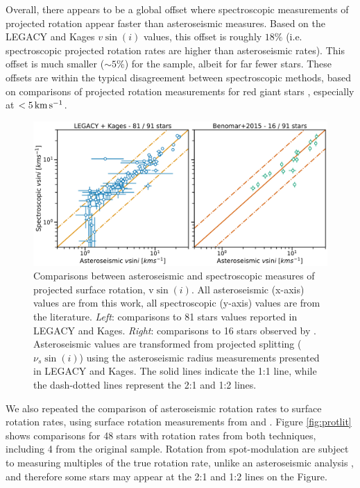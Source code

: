 \documentclass[12pt]{article}
\begin{document}
Overall, there appears to be a global offset where spectroscopic measurements of projected rotation appear faster than asteroseismic measures. Based on the LEGACY and Kages $v\sin(i)$ values, this offset is roughly $18\%$ (i.e. spectroscopic projected rotation rates are higher than asteroseismic rates). This offset is much smaller ($\sim5\%$) for the \cite{benomar+2015} sample, albeit for far fewer stars. These offsets are within the typical disagreement between spectroscopic methods, based on comparisons of projected rotation measurements for red giant stars \cite[see Figure 2]{tayar+2015}, especially at $< 5\, \rm{km\,s^{-1}}$.\\

\begin{figure}
	\centering
	\includegraphics[width=\textwidth]{Images/vsini-comparison.pdf}
	\caption{Comparisons between asteroseismic and spectroscopic measures of projected surface rotation, $\textrm{v}\sin(i)$. All asteroseismic (x-axis) values are from this work, all spectroscopic (y-axis) values are from the literature. \textit{Left}: comparisons to 81 stars values reported in LEGACY and Kages. \textit{Right}: comparisons to 16 stars observed by \cite{benomar+2015}. Asteroseismic values are transformed from projected splitting ($\nu_s\sin(i)$) using the asteroseismic radius measurements presented in LEGACY and Kages. The solid lines indicate the 1:1 line, while the dash-dotted lines represent the 2:1 and 1:2 lines.}
	\label{fig:vsinilit}
\end{figure}

We also repeated the \cite{nielsen+2015} comparison of asteroseismic rotation rates to surface rotation rates, using surface rotation measurements from \cite{nielsen+2013} and \cite{garcia+2014}. Figure \ref{fig:protlit} shows comparisons for 48 stars with rotation rates from both techniques, including 4 from the original \cite{nielsen+2015} sample. Rotation from spot-modulation are subject to measuring multiples of the true rotation rate, unlike an asteroseismic analysis \cite{mcquillan+2014}, and therefore some stars may appear at the 2:1 and 1:2 lines on the Figure.
\end{document}
